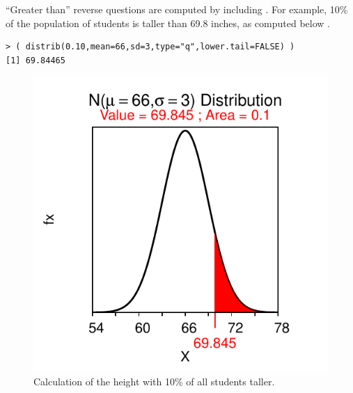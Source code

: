 \documentclass[10pt,openany]{book}\usepackage[]{graphicx}\usepackage[]{color}
\makeatletter
\newenvironment{kframe}{%
 \def\at@end@of@kframe{}%
 \ifinner\ifhmode%
  \def\at@end@of@kframe{\end{minipage}}%
  \begin{minipage}{\columnwidth}%
 \fi\fi%
 \def\FrameCommand##1{\hskip\@totalleftmargin \hskip-\fboxsep
 \colorbox{shadecolor}{##1}\hskip-\fboxsep
     \hskip-\linewidth \hskip-\@totalleftmargin \hskip\columnwidth}%
 \MakeFramed {\advance\hsize-\width
   \@totalleftmargin\z@ \linewidth\hsize
   \@setminipage}}%
 {\par\unskip\endMakeFramed%
 \at@end@of@kframe}
\newenvironment{knitrout}{}{} %
\makeatother
\begin{document}
``Greater than'' reverse questions are computed by including .  For example, 10\% of the population of students is taller than 69.8 inches, as computed below .
\begin{knitrout}
\color{fgcolor}\begin{kframe}
\begin{verbatim}
> ( distrib(0.10,mean=66,sd=3,type="q",lower.tail=FALSE) )
[1] 69.84465
\end{verbatim}
\end{kframe}\begin{figure}[hbtp]

{\centering \includegraphics[width=.4\linewidth]{Figs/NormZCalc5-1} 

}

\caption[Calculation of the height with 10\% of all students taller]{Calculation of the height with 10\% of all students taller.}\label{fig:NormZCalc5}
\end{figure}


\end{knitrout}
\end{document}
